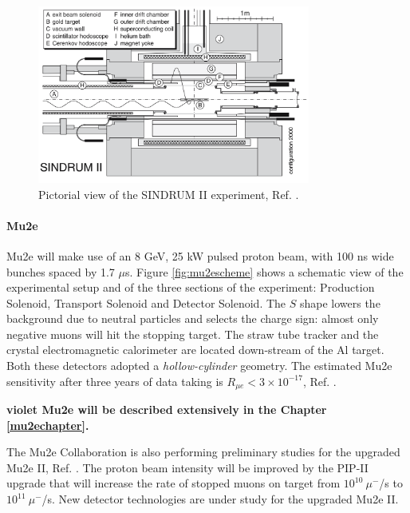 \begin{figure}[!h]
\centering
\includegraphics[width =0.8\textwidth]{figures/png/Screenshot_20240307_163120.png}
\caption[SINDRUM II experiment.]{Pictorial view of the SINDRUM II experiment, Ref. \cite{SINDRUMII:2006dvw}.}
\label{fig:sindrumii}
\end{figure}
\paragraph{Mu2e}
Mu2e will make use of an 8 GeV, 25 kW pulsed proton beam, with 100 ns wide bunches spaced by 1.7 $\mu$s. 
Figure \ref{fig:mu2escheme} shows a schematic view of the experimental setup and of the
three sections of the experiment: Production Solenoid, Transport
Solenoid and Detector Solenoid. The $S$ shape lowers the background due to 
neutral particles and selects the charge sign: almost only negative muons will hit the stopping target. 
The straw tube tracker and the crystal electromagnetic calorimeter are located down-stream of the Al target. 
Both these detectors adopted a \textit{hollow-cylinder} geometry. 
The estimated Mu2e sensitivity after three years of data taking is $R_{\mu e} < 3 \times 10^{-17}$, Ref. \cite{universe9010054}.

{\bf violet Mu2e will be described extensively in the Chapter \ref{mu2echapter}.}

The Mu2e Collaboration is also performing preliminary studies for the upgraded Mu2e II, Ref. \cite{dukes}. 
The proton beam intensity will be improved by the PIP-II upgrade that will increase the rate of stopped muons 
on target from $10^{10} \ \mu^-$/s to $10^{11} \ \mu^-$/s. New detector technologies are under study for the upgraded
Mu2e II.
